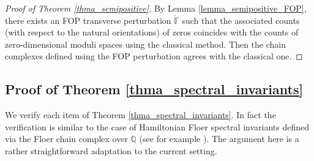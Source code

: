\documentclass[reqno, 10pt]{amsart}
\numberwithin{equation}{section}
\numberwithin{equation}{section}
\theoremstyle{definition}
\theoremstyle{remark}
\newcommand{\mb}{\mathbb}
\begin{document}
\begin{proof}[Proof of Theorem \ref{thma_semipositive}]
By Lemma \ref{lemma_semipositive_FOP}, there exists an FOP transverse perturbation $\mathring {\mb F}$ such that the associated counts (with respect to the natural orientations) of zeros coincides with the counts of zero-dimensional moduli spaces using the classical method. Then the chain complexes defined using the FOP perturbation agrees with the classical one. 
\end{proof}


\subsection{Proof of Theorem \ref{thma_spectral_invariants}}\label{subsection_proof_spectral}


We verify each item of Theorem \ref{thma_spectral_invariants}. In fact the verification is similar to the case of Hamiltonian Floer spectral invariants defined via the Floer chain complex over ${\mb Q}$ (see for example \cite{FOOO_spectral}). The argument here is a rather straightforward adaptation to the current setting.%
\end{document}
